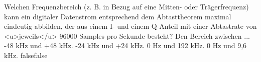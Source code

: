     {Welchen Frequenzbereich (z. B. in Bezug auf eine Mitten- oder Trägerfrequenz) kann ein digitaler Datenstrom entsprechend dem Abtasttheorem maximal eindeutig abbilden, der aus einem I- und einem Q-Anteil mit einer Abtastrate von <u>jeweils</u> 96000 Samples pro Sekunde besteht? Den Bereich zwischen ...}
    {-48 kHz und +48 kHz.}
    {-24 kHz und +24 kHz.}
    {0 Hz und 192 kHz.}
    {0 Hz und 9,6 kHz.}
    {false}{false}